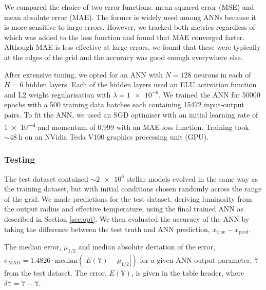 \documentclass[a4paper,fleqn,usenatbib]{mnras}
\begin{document}
We compared the choice of two error functions: mean squared error (MSE) and mean absolute error (MAE). The former is widely used among ANNs because it is more sensitive to large errors. However, we tracked both metrics regardless of which was added to the loss function and found that MAE converged faster. Although MAE is less effective at large errors, we found that these were typically at the edges of the grid and the accuracy was good enough everywhere else.

After extensive tuning, we opted for an ANN with $N=128$ neurons in each of $H=6$ hidden layers. Each of the hidden layers used an ELU activation function and L2 weight regularisation with $\lambda = \num{1e-6}$. We trained the ANN for \num{50000} epochs with a \num{500} training data batches each containing \num{15472} input-output pairs. To fit the ANN, we used an SGD optimiser with an initial learning rate of \num{1e-4} and momentum of \num{0.999} with an MAE loss function. Training took $\sim \SI{48}{\hour}$ on an NVidia Tesla V100 graphics processing unit (GPU).

\subsubsection{Testing}\label{sec:test}

The test dataset contained $\sim \num{2e6}$ stellar models evolved in the same way as the training dataset, but with initial conditions chosen randomly across the range of the grid. We made predictions for the test dataset, deriving luminosity from the output radius and effective temperature, using the final trained ANN as described in Section \ref{sec:opt}. We then evaluated the accuracy of the ANN by taking the difference between the test truth and ANN prediction, $x_\mathrm{true} - x_\mathrm{pred}$. 

\begin{table}
	\centering
	\caption{The median error, $\mu_{1/2}$ and median absolute deviation of the error, $\sigma_\mathrm{MAD} = 1.4826\cdot\mathrm{median}(|E(\mathbb{Y}) - \mu_{1/2}|)$ for a given ANN output parameter, $\mathbb{Y}$ from the test dataset. The error, $E(\mathbb{Y})$, is given in the table header, where $\delta \mathbb{Y} = \widetilde{\mathbb{Y}} - \mathbb{Y}$.}
	\label{tab:test}
        
\end{table}
\end{document}
